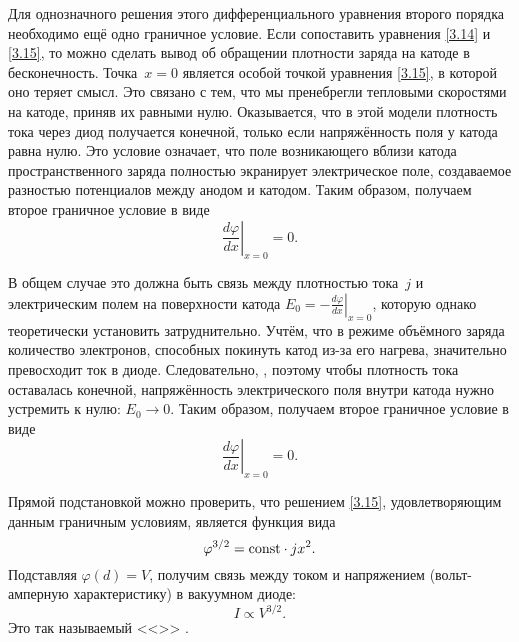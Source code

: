 Для однозначного решения этого дифференциального уравнения второго порядка
необходимо ещё одно граничное условие.
 Если сопоставить уравнения \eqref{3.14} и \eqref{3.15}, то можно сделать вывод
об обращении плотности заряда на катоде в бесконечность. Точка~$x=0$ является
особой точкой уравнения \eqref{3.15}, в которой оно теряет смысл. Это связано с
тем, что мы пренебрегли тепловыми скоростями на катоде, приняв их равными нулю.
Оказывается, что в этой модели плотность тока через диод получается конечной,
только если напряжённость поля у катода равна нулю.
Это условие означает, что поле возникающего вблизи катода пространственного заряда полностью экранирует
электрическое поле, создаваемое разностью потенциалов между анодом и катодом.
Таким образом, получаем второе граничное условие в виде
\begin{equation*}
    \left.\frac{d\varphi}{dx}\right|_{x = 0}=0.
\end{equation*}
\todo[inline]{<---}

В общем случае это должна быть связь между плотностью тока~$j$ и электрическим
полем на поверхности катода $E_0 = -\left.\frac{d\varphi}{dx}\right|_{x=0}$,
которую однако  теоретически установить затруднительно.
Учтём, что в режиме объёмного заряда количество электронов, способных покинуть
катод из-за его нагрева, значительно превосходит ток в диоде.
Следовательно, ,
поэтому чтобы плотность тока оставалась конечной,
напряжённость электрического поля внутри катода нужно устремить к нулю: $E_0\to 0$.
Таким образом, получаем второе граничное условие в виде
\begin{equation*}
    \left.\frac{d\varphi}{dx}\right|_{x = 0}=0.
\end{equation*}

Прямой подстановкой можно проверить, что решением \eqref{3.15},
удовлетворяющим данным граничным условиям, является функция вида
\begin{equation*}
    \varphi^{3/2} =\mathrm{const} \cdot j x^2.
\end{equation*}
Подставляя $\varphi(d)=V$, получим связь между током и напряжением
(вольт-амперную характеристику) в вакуумном диоде:
\begin{equation}
    I \propto V^{3/2}.
\end{equation}
Это так называемый <<>> .

